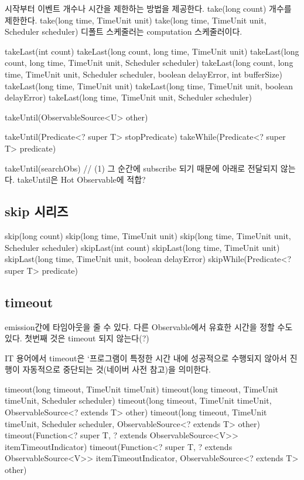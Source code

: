 \documentclass{book}
\begin{document}
{시작부터 이벤트 개수나 시간을 제한하는 방법을 제공한다.
take(long count)
개수를 제한한다.
take(long time, TimeUnit unit)
take(long time, TimeUnit unit, Scheduler scheduler)
디폴트 스케줄러는 computation 스케줄러이다.



takeLast(int count)
takeLast(long count, long time, TimeUnit unit)
takeLast(long count, long time, TimeUnit unit, Scheduler scheduler)
takeLast(long count, long time, TimeUnit unit, Scheduler scheduler, boolean delayError, int bufferSize)
takeLast(long time, TimeUnit unit)
takeLast(long time, TimeUnit unit, boolean delayError)
takeLast(long time, TimeUnit unit, Scheduler scheduler)

takeUntil(ObservableSource<U> other)

takeUntil(Predicate<? super T> stopPredicate)
takeWhile(Predicate<? super T> predicate)

takeUntil(searchObs) // (1) 그 순간에 subscribe 되기 때문에 아래로 전달되지 않는다. takeUntil은 Hot Observable에 적합?


\subsection{skip 시리즈}
skip(long count)
skip(long time, TimeUnit unit)
skip(long time, TimeUnit unit, Scheduler scheduler)
skipLast(int count)
skipLast(long time, TimeUnit unit)
skipLast(long time, TimeUnit unit, boolean delayError)
skipWhile(Predicate<? super T> predicate)

\subsection{timeout}
emission간에 타임아웃을 줄 수 있다.
다른 Observable에서 유효한 시간을 정할 수도 있다. 
첫번째 것은 timeout 되지 않는다(?)

IT 용어에서 timeout은 ‘프로그램이 특정한 시간 내에 성공적으로 수행되지 않아서 진행이 자동적으로 중단되는 것(네이버 사전 참고)을 의미한다. 

timeout(long timeout, TimeUnit timeUnit)
timeout(long timeout, TimeUnit timeUnit, Scheduler scheduler)
timeout(long timeout, TimeUnit timeUnit, ObservableSource<? extends T> other)
timeout(long timeout, TimeUnit timeUnit, Scheduler scheduler, ObservableSource<? extends T> other)
timeout(Function<? super T, ? extends ObservableSource<V>> itemTimeoutIndicator)
timeout(Function<? super T, ? extends ObservableSource<V>> itemTimeoutIndicator,
            ObservableSource<? extends T> other)

}
\end{document}
